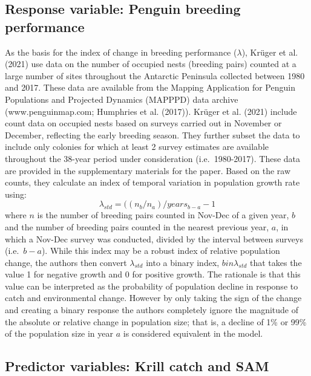 \documentclass[]{elsarticle} %
\begin{document}
\hypertarget{response-variable-penguin-breeding-performance}{%
\subsection{Response variable: Penguin breeding
performance}\label{response-variable-penguin-breeding-performance}}

As the basis for the index of change in breeding performance
(\(\lambda\)), Krüger et al. (2021) use data on the number of occupied
nests (breeding pairs) counted at a large number of sites throughout the
Antarctic Peninsula collected between 1980 and 2017. These data are
available from the Mapping Application for Penguin Populations and
Projected Dynamics (MAPPPD) data archive (www.penguinmap.com; Humphries
et al. (2017)). Krüger et al. (2021) include count data on occupied
nests based on surveys carried out in November or December, reflecting
the early breeding season. They further subset the data to include only
colonies for which at least 2 survey estimates are available throughout
the 38-year period under consideration (i.e.~1980-2017). These data are
provided in the supplementary materials for the paper. Based on the raw
counts, they calculate an index of temporal variation in population
growth rate using: \[\lambda_{std}=((n_b/n_a)/years_{b-a}-1\] where
\(n\) is the number of breeding pairs counted in Nov-Dec of a given
year, \(b\) and the number of breeding pairs counted in the nearest
previous year, \(a\), in which a Nov-Dec survey was conducted, divided
by the interval between surveys (i.e.~\(b-a\)). While this index may be
a robust index of relative population change, the authors then convert
\(\lambda_{std}\) into a binary index, \(bin\lambda_{std}\) that takes
the value 1 for negative growth and 0 for positive growth. The rationale
is that this value can be interpreted as the probability of population
decline in response to catch and environmental change. However by only
taking the sign of the change and creating a binary response the authors
completely ignore the magnitude of the absolute or relative change in
population size; that is, a decline of 1\% or 99\% of the population
size in year \(a\) is considered equivalent in the model.

\hypertarget{predictor-variables-krill-catch-and-sam}{%
\subsection{Predictor variables: Krill catch and
SAM}\label{predictor-variables-krill-catch-and-sam}}
\end{document}
